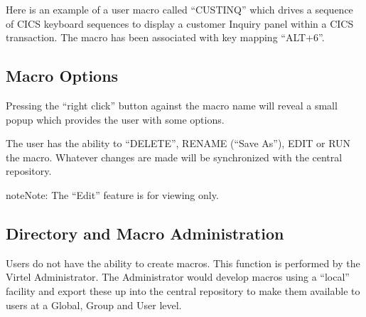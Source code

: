 \documentclass[letterpaper,10pt,english]{sphinxmanual}
\begin{document}
\sphinxAtStartPar
Here is an example of a user macro called “CUSTINQ” which drives a sequence of CICS keyboard sequences to display a customer Inquiry panel within a CICS transaction. The macro has been associated with key mapping “ALT+6”.

\sphinxAtStartPar
{}

\ignorespaces 

\subsection{Macro Options}
\label{\detokenize{Customization:macro-options}}\label{\detokenize{Customization:index-89}}
\sphinxAtStartPar
Pressing the “right click” button against the macro name will reveal a small popup which provides the user with some options.

\sphinxAtStartPar
{}

\sphinxAtStartPar
The user has the ability to “DELETE”, RENAME (“Save As”), EDIT or RUN the macro. Whatever changes are made will be synchronized with the central repository.

\begin{sphinxadmonition}{note}{Note:}
\sphinxAtStartPar
The “Edit” feature is for viewing only.
\end{sphinxadmonition}

\ignorespaces 

\subsection{Directory and Macro Administration}
\label{\detokenize{Customization:directory-and-macro-administration}}\label{\detokenize{Customization:index-90}}
\sphinxAtStartPar
Users do not have the ability to create macros. This function is performed by the Virtel Administrator. The Administrator would develop macros using a “local” facility and export these up into the central repository to make them available to users at a Global, Group and User level.
\end{document}
